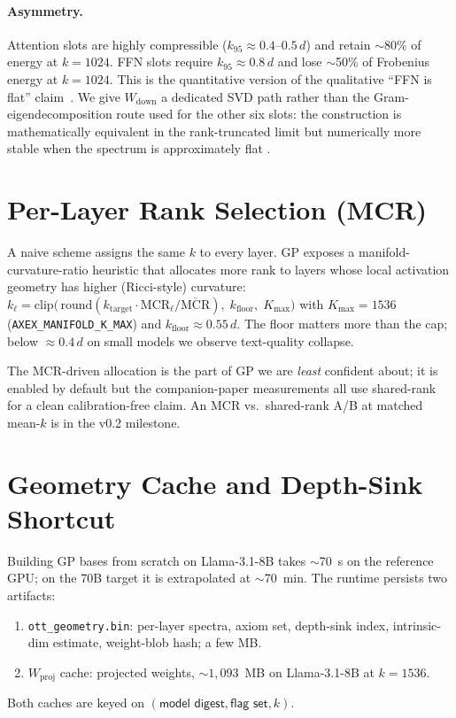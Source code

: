 \documentclass[11pt]{article}
\begin{document}
\paragraph{Asymmetry.}  Attention slots are highly compressible ($k_{95}\approx
0.4$--$0.5\,d$) and retain $\sim$80\% of energy at $k{=}1024$.  FFN slots
require $k_{95}\approx 0.8\,d$ and lose $\sim$50\% of Frobenius energy at
$k{=}1024$.  This is the quantitative version of the qualitative
``FFN is flat'' claim~\cite{geva2021ffn}.  We give $W_\text{down}$ a dedicated
SVD path rather than the Gram-eigendecomposition route used for the other
six slots: the construction is mathematically equivalent in the rank-truncated
limit but numerically more stable when the spectrum is approximately flat
\cite{golub2013matrix}.

\section{Per-Layer Rank Selection (MCR)}
\label{sec:mcr}
A naive scheme assigns the same $k$ to every layer.  GP exposes a
manifold-curvature-ratio heuristic that allocates more rank to layers
whose local activation geometry has higher (Ricci-style) curvature:
$k_\ell = \mathrm{clip}\bigl(\,\mathrm{round}(k_\text{target}\cdot
\mathrm{MCR}_\ell/\overline{\mathrm{MCR}}),\;k_\text{floor},\;K_\text{max}\bigr)$
with $K_\text{max}{=}1536$ (\texttt{AXEX\_MANIFOLD\_K\_MAX}) and
$k_\text{floor}\approx 0.55\,d$.  The floor matters more than the cap; below
$\approx 0.4\,d$ on small models we observe text-quality collapse.

\begin{htnote}
The MCR-driven allocation is the part of GP we are \emph{least} confident
about; it is enabled by default but the companion-paper measurements all
use shared-rank for a clean calibration-free claim.  An MCR vs.\
shared-rank A/B at matched mean-$k$ is in the v0.2 milestone.
\end{htnote}

\section{Geometry Cache and Depth-Sink Shortcut}
\label{sec:cache}
Building GP bases from scratch on Llama-3.1-8B takes $\sim$70~s on the
reference GPU; on the 70B target it is extrapolated at $\sim$70~min.  The
runtime persists two artifacts:
\begin{enumerate}
\item \texttt{ott\_geometry.bin}: per-layer spectra, axiom set, depth-sink
index, intrinsic-dim estimate, weight-blob hash; a few MB.
\item $W_\text{proj}$ cache: projected weights, $\sim 1{,}093$~MB on
Llama-3.1-8B at $k{=}1536$.
\end{enumerate}
Both caches are keyed on $(\textsf{model digest},\textsf{flag set},k)$.
\end{document}
